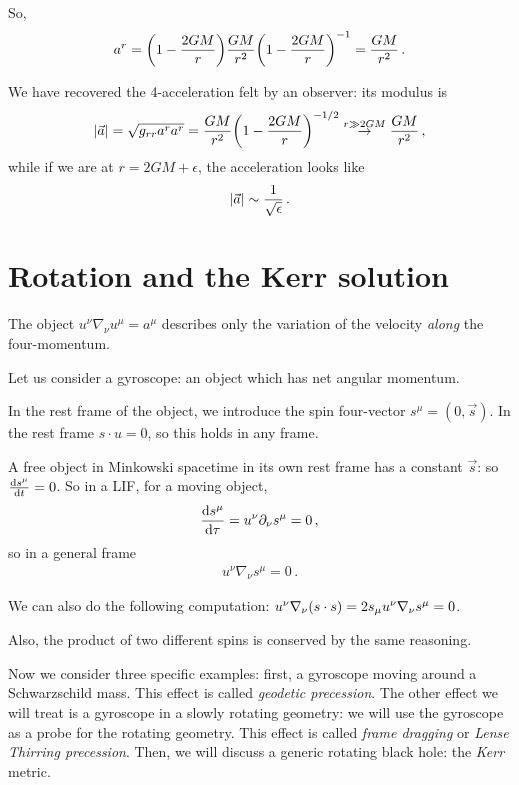 \documentclass[main.tex]{subfiles}
\begin{document}
So, 
%
\begin{align}
  a^{r} = \qty(1 - \frac{2GM}{r}) \frac{GM}{r^2} \qty(1 - \frac{2GM}{r})^{-1} = \frac{GM}{r^2}
\,.
\end{align}

We have recovered the 4-acceleration felt by an observer: its modulus is 
%
\begin{align}
  \abs{\vec{a}} = \sqrt{g_{rr} a^{r} a^{r}} = \frac{GM}{r^2} \qty(1 - \frac{2GM}{r})^{-1/2} \overset{r \gg 2GM}{\rightarrow} \frac{GM}{r^2}
\,,
\end{align}
% 
while if we are at \(r = 2GM + \epsilon \), the acceleration looks like 
%
\begin{align}
  \abs{\vec{a}} \sim \frac{1}{\sqrt{ \epsilon }}
\,.
\end{align}

\section{Rotation and the Kerr solution}

The object \(u^{\nu } \nabla_{\nu } u^{\mu  } = a^{\mu } \) describes only the variation of the velocity \emph{along} the four-momentum. 

Let us consider a gyroscope: an object which has net angular momentum. 

In the rest frame of the object, we introduce the spin four-vector \(s^{\mu } = (0, \vec{s})\). 
In the rest frame \(s \cdot u = 0\), so this holds in any frame. 

A free object in Minkowski spacetime in its own rest frame has a constant \(\vec{s}\): so \(\dv{s^{\mu }}{t} = 0\). 
So in a LIF, for a moving object, 
%
\begin{align}
  \dv{s^{\mu }}{\tau } = u^{\nu } \partial_{\nu } s^{\mu } = 0
\,,
\end{align}
%
so in a general frame 
%
\begin{align}
  u^{\nu } \nabla_{\nu } s^{\mu } = 0
\,.
\end{align}

We can also do the following computation: \( u^{\nu } \nabla_{\nu } \qty(s \cdot s )= 2 s_{\mu } u^{\nu } \nabla_{\nu } s^{\mu } = 0\). 

Also, the product of two different spins is conserved by the same reasoning. 

Now we consider three specific examples: first, a gyroscope moving around a Schwarzschild mass. 
This effect is called \emph{geodetic precession}. 
The other effect we will treat is a gyroscope in a slowly rotating geometry: we will use the gyroscope as a probe for the rotating geometry.
This effect is called \emph{frame dragging} or \emph{Lense Thirring precession}. 
Then, we will discuss a generic rotating black hole: the \emph{Kerr} metric. 
\end{document}
